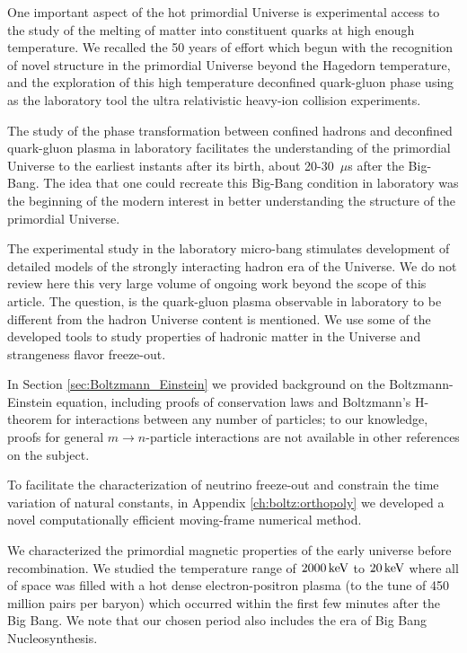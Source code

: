 One important aspect of the hot primordial Universe is experimental access to the study of the melting of matter into constituent quarks at high enough temperature. We recalled the 50 years of effort which begun with the recognition  of novel structure in the primordial Universe beyond the Hagedorn temperature, and the exploration of this high temperature deconfined quark-gluon phase using as the laboratory tool the ultra relativistic heavy-ion collision experiments. 

The study of the phase transformation between confined hadrons and deconfined quark-gluon plasma in laboratory facilitates the understanding of the primordial Universe to the earliest instants after its birth, about 20-30\, $\mu$s after the Big-Bang. The idea that one could recreate this Big-Bang condition in laboratory was the beginning of the modern interest in better understanding the structure of the primordial Universe. 

The experimental study in the laboratory micro-bang  stimulates development of detailed models of the strongly interacting hadron era of the Universe. We do not review here this very large volume of ongoing work beyond the scope of this article. The question, is the quark-gluon plasma observable in laboratory to be different from the hadron Universe content is mentioned. We use some of the developed tools to study properties of hadronic matter in the Universe and strangeness flavor freeze-out.



In Section \ref{sec:Boltzmann_Einstein} we provided background on the Boltzmann-Einstein equation, including proofs of conservation laws and Boltzmann's H-theorem for interactions between any number of particles; to our knowledge, proofs for general $m\to n$-particle interactions are not available in other references on the subject.

To facilitate the characterization of neutrino freeze-out and constrain the time variation of natural constants, in Appendix \ref{ch:boltz:orthopoly} we developed a novel computationally efficient moving-frame numerical method.

We characterized the primordial magnetic properties of the early universe before recombination. We studied the temperature range of $2000\text{\,keV}$ to $20\text{\,keV}$ where all of space was filled with a hot dense electron-positron plasma (to the tune of 450 million pairs per baryon) which occurred within the first few minutes after the Big Bang. We note that our chosen period also includes the era of Big Bang Nucleosynthesis.

